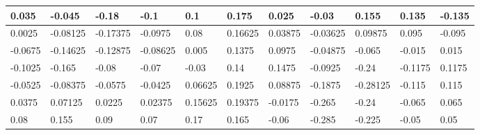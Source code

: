 \begin{tabular}{|l|l|l|l|l|l|l|l|l|l|l|}
\hline
0.035&-0.045&-0.18&-0.1&0.1&0.175&0.025&-0.03&0.155&0.135&-0.135\\\hline
0.0025&-0.08125&-0.17375&-0.0975&0.08&0.16625&0.03875&-0.03625&0.09875&0.095&-0.095\\\hline
-0.0675&-0.14625&-0.12875&-0.08625&0.005&0.1375&0.0975&-0.04875&-0.065&-0.015&0.015\\\hline
-0.1025&-0.165&-0.08&-0.07&-0.03&0.14&0.1475&-0.0925&-0.24&-0.1175&0.1175\\\hline
-0.0525&-0.08375&-0.0575&-0.0425&0.06625&0.1925&0.08875&-0.1875&-0.28125&-0.115&0.115\\\hline
0.0375&0.07125&0.0225&0.02375&0.15625&0.19375&-0.0175&-0.265&-0.24&-0.065&0.065\\\hline
0.08&0.155&0.09&0.07&0.17&0.165&-0.06&-0.285&-0.225&-0.05&0.05\\\hline
\end{tabular}
